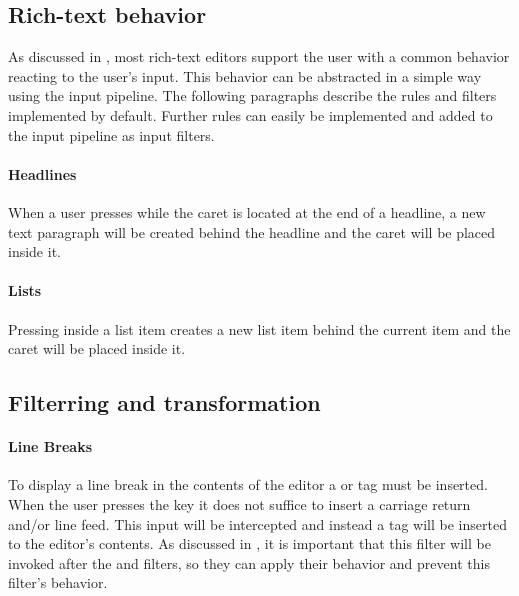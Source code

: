 \subsection{Rich-text behavior}
\label{subsec:re_behavior_implementation}

As discussed in , most rich-text editors support the user with a common behavior reacting to the user's input. This behavior can be abstracted in a simple way using the input pipeline. The following paragraphs describe the rules and filters implemented by default. Further rules can easily be implemented and added to the input pipeline as input filters.

\paragraph{Headlines} When a user presses  while the caret is located at the end of a headline, a new text paragraph will be created behind the headline and the caret will be placed inside it.

\paragraph{Lists} Pressing  inside a list item creates a new list item behind the current item and the caret will be placed inside it.

\subsection{Filterring and transformation}

\paragraph{Line Breaks} To display a line break in the contents of the editor a  or  tag must be inserted. When the user presses the  key it does not suffice to insert a carriage return and/or line feed. This input will be intercepted and instead a  tag will be inserted to the editor's contents. As discussed in , it is important that this filter will be invoked after the  and  filters, so they can apply their behavior and prevent this filter's behavior.



